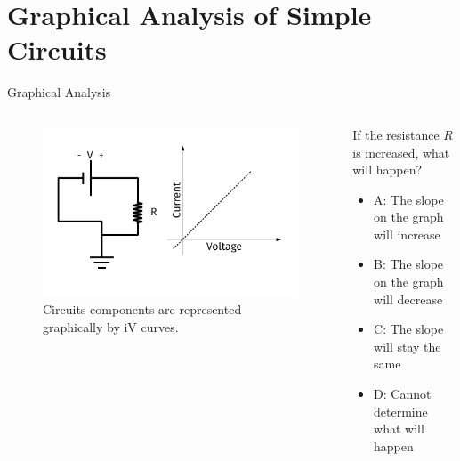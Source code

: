 \documentclass{beamer}
\begin{document}
\section{Graphical Analysis of Simple Circuits}

\begin{frame}{Graphical Analysis}
\begin{columns}[T]
\begin{column}{0.5\textwidth}
\begin{figure}
\centering
\includegraphics[width=\textwidth,trim=0.5cm 0cm 1cm 0cm,clip=true]{figures/iVCurve.pdf}
\caption{\label{fig:iVCurve1} Circuits components are represented graphically by iV curves.}
\end{figure}
\end{column}
\begin{column}{0.5\textwidth}
\small
If the resistance $R$ is increased, what will happen?
\begin{itemize}
\item A: The slope on the graph will increase
\item B: The slope on the graph will decrease
\item C: The slope will stay the same
\item D: Cannot determine what will happen
\end{itemize}
\end{column}
\end{columns}
\end{frame}
\end{document}
